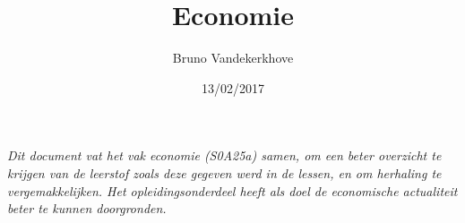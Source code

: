 \title{Economie}
\author{Bruno Vandekerkhove}
\date{13/02/2017}
\maketitle
\thispagestyle{empty}

\begin{center}
\textit{Dit document vat het vak economie (S0A25a) samen, om een beter overzicht te krijgen van de leerstof zoals deze gegeven werd in de lessen, en om herhaling te vergemakkelijken. Het opleidingsonderdeel heeft als doel de economische actualiteit beter te kunnen doorgronden.}
\end{center}